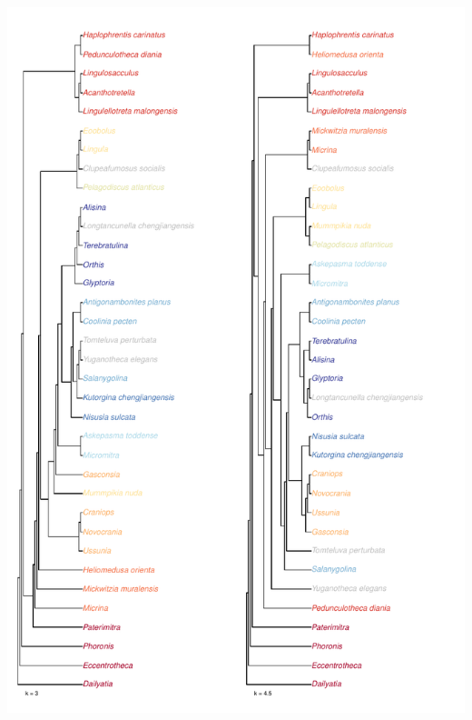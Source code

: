 \documentclass[]{book}
\theoremstyle{definition}
\theoremstyle{definition}
\theoremstyle{definition}
\theoremstyle{remark}
\begin{document}
\includegraphics{Brachiopod_phylogeny_files/figure-latex/unnamed-chunk-6-2.pdf}
\end{document}

